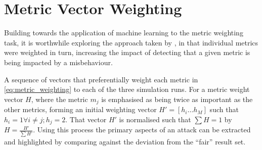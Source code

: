 \section{Metric Vector Weighting}\label{sec:metric_weighting}
%
Building towards the application of machine learning to the metric weighting task, it is worthwhile exploring the approach taken by \cite{Guo11}, in that individual metrics were weighted in turn, increasing the impact of detecting that a given metric is being impacted by a misbehaviour. 

A sequence of vectors that preferentially weight each metric in \autoref{eq:metric_weighting} to each of the three simulation runs.
For a metric weight vector $H$, where the metric $m_j$ is emphasised as being twice as important as the other metrics, forming an initial weighting vector $H'=[h_i\dots h_M]$ such that $h_i = 1 \forall i \ne j; h_j=2$.
That vector $H'$ is normalised such that $\sum H = 1$ by $H= \frac{H'}{\sum H'}$.
Using this process the primary aspects of an attack can be extracted and highlighted by comparing against the deviation from the ``fair'' result set. 

